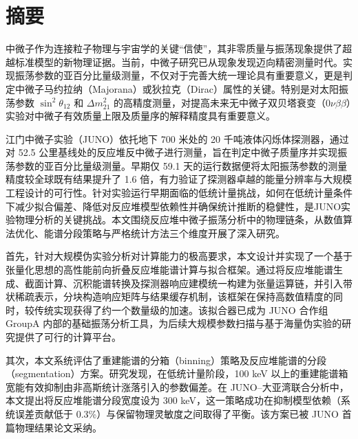 
\maketitle%
\MAKETITLE%
\makedeclaration%
\intobmk\chapter*{摘\quad 要}%
\setcounter{page}{1}%

中微子作为连接粒子物理与宇宙学的关键“信使”，其非零质量与振荡现象提供了超越标准模型的新物理证据。当前，中微子研究已从现象发现迈向精密测量时代。实现振荡参数的亚百分比量级测量，不仅对于完善大统一理论具有重要意义，更是判定中微子马约拉纳（Majorana）或狄拉克（Dirac）属性的关键。特别是对太阳振荡参数 $\sin^2\theta_{12}$ 和 $\Delta m^2_{21}$ 的高精度测量，对提高未来无中微子双贝塔衰变（$0\nu\beta\beta$）实验对中微子有效质量上限及质量序的解释精度具有重要意义。

江门中微子实验（JUNO）依托地下 700 米处的 20 千吨液体闪烁体探测器，通过对 52.5 公里基线处的反应堆反中微子进行测量，旨在判定中微子质量序并实现振荡参数的亚百分比量级测量。早期仅 59.1 天的运行数据便将太阳振荡参数的测量精度较全球既有结果提升了 1.6 倍，有力验证了探测器卓越的能量分辨率与大规模工程设计的可行性。针对实验运行早期面临的低统计量挑战，如何在低统计量条件下减少拟合偏差、降低对反应堆模型依赖性并确保统计推断的稳健性，是JUNO实验物理分析的关键挑战。本文围绕反应堆中微子振荡分析中的物理链条，从数值算法优化、能谱分段策略与严格统计方法三个维度开展了深入研究。

首先，针对大规模伪实验分析对计算能力的极高要求，本文设计并实现了一个基于张量化思想的高性能前向折叠反应堆能谱计算与拟合框架。通过将反应堆能谱生成、截面计算、沉积能谱转换及探测器响应建模统一构建为张量运算链，并引入带状稀疏表示，分块构造响应矩阵与结果缓存机制，该框架在保持高数值精度的同时，较传统实现获得了约一个数量级的加速。该拟合器已成为 JUNO 合作组 GroupA 内部的基础振荡分析工具，为后续大规模参数扫描与基于海量伪实验的研究提供了可行的计算平台。

其次，本文系统评估了重建能谱的分箱（binning）策略及反应堆能谱的分段（segmentation）方案。研究发现，在低统计量阶段，100 keV 以上的重建能谱箱宽能有效抑制由非高斯统计涨落引入的参数偏差。在 JUNO–大亚湾联合分析中，本文提出将反应堆能谱分段宽度设为 300 keV，这一策略成功在抑制模型依赖（系统误差贡献低于 0.3\%）与保留物理灵敏度之间取得了平衡。该方案已被 JUNO 首篇物理结果论文采纳。

